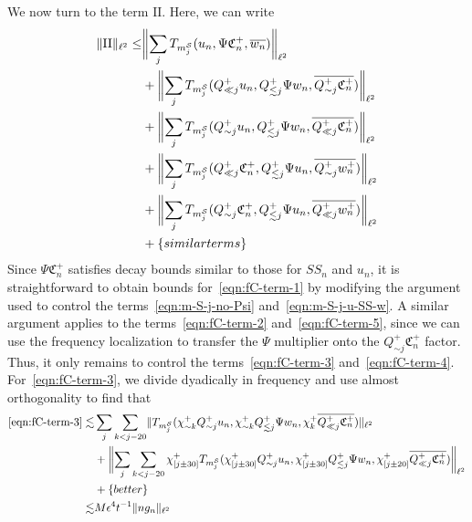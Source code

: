 \documentclass[letterpaper, reqno,final]{amsart}
\newcommand{\cS}{\mathcal{S}}
\newcommand{\fC}{\mathfrak{C}}
\newcommand{\rmII}{\mathrm{II}}
\newcommand{\mSS}{\mathit{SS}}
\newcommand{\btext}[1]{\left\{\textup{#1}\right\}}
\newcommand{\bbetter}{\btext{better}}
\newcommand{\bsim}{\btext{similar terms}}
\begin{document}
We now turn to the term $\rmII$.  Here, we can write
\begin{subequations}\begin{align}
    \lVert \rmII \rVert_{\ell^2} \leq& \biggl \lVert \sum_{j} T_{m_j^\cS}(u_n, \Psi \fC_n^+, \overline{w_n}) \biggr\rVert_{\ell^2} \label{eqn:fC-term-1}\\
    &+ \biggl\lVert \sum_j T_{m_j^\cS}(Q_{\ll j}^+ u_n, Q_{\lesssim j}^+ \Psi w_n, \overline{Q_{\sim j}^+ \fC_n^+}) \biggr\rVert_{\ell^2} \label{eqn:fC-term-2}\\
    &+ \biggl\lVert \sum_j T_{m_j^\cS}(Q_{\sim j}^+ u_n, Q_{\lesssim j}^+ \Psi w_n, \overline{Q_{\ll j}^+ \fC_n^+}) \biggr\rVert_{\ell^2} \label{eqn:fC-term-3}\\
    &+ \biggl\lVert \sum_j T_{m_j^\cS}(Q_{\ll j}^+ \fC_n^+, Q_{\lesssim j}^+ \Psi u_n, \overline{Q_{\sim j}^+ w_n^+}) \biggr\rVert_{\ell^2} \label{eqn:fC-term-4}\\
    &+ \biggl\lVert \sum_j T_{m_j^\cS}(Q_{\sim j}^+ \fC_n^+, Q_{\lesssim j}^+ \Psi u_n, \overline{Q_{\ll j}^+ w_n^+}) \biggr\rVert_{\ell^2} \label{eqn:fC-term-5}\\
    &+ \bsim \notag
\end{align}
\end{subequations}
Since $\Psi \fC_n^+$ satisfies decay bounds similar to those for $\mSS_n$ and $u_n$, it is straightforward to obtain bounds for~\eqref{eqn:fC-term-1} by modifying the argument used to control the terms~\eqref{eqn:m-S-j-no-Psi} and~\eqref{eqn:m-S-j-u-SS-w}.  A similar argument applies to the terms~\eqref{eqn:fC-term-2} and~\eqref{eqn:fC-term-5}, since we can use the frequency localization to transfer the $\Psi$ multiplier onto the $Q_{\sim j}^+ \fC_n^+$ factor.  Thus, it only remains to control the terms~\eqref{eqn:fC-term-3} and~\eqref{eqn:fC-term-4}.  For~\eqref{eqn:fC-term-3}, we divide dyadically in frequency and use almost orthogonality to find that
\begin{equation*}\begin{split}
    \eqref{eqn:fC-term-3} \lesssim& \sum_j \sum_{k < j - 20} \lVert T_{m_j^\cS}(\chi_{\sim k}^+ Q_{\sim j}^+ u_n, \chi_{\sim k}^+ Q_{\lesssim j}^+ \Psi w_n, \chi_k^+ \overline{Q_{\ll j}^+ \fC_n^+}) \rVert_{\ell^2}\\
    &+ \biggl\lVert \sum_j \sum_{k < j - 20}\chi_{[j \pm 30]}^+ T_{m_j^\cS}(\chi_{[j \pm 30]}^+ Q_{\sim j}^+ u_n, \chi_{[j \pm 30]}^+ Q_{\lesssim j}^+ \Psi w_n, \chi_{[j \pm 20]}^+ \overline{Q_{\ll j}^+ \fC_n^+}) \biggr\rVert_{\ell^2}\\
    &+ \bbetter\\
    \lesssim& M \epsilon^4 t^{-1} \lVert ng_n \rVert_{\ell^2}
\end{split}
\end{equation*}
\end{document}
